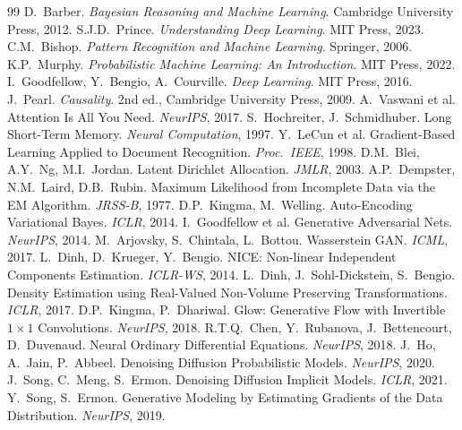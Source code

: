 \documentclass[11pt,a4paper,openany]{book}
\theoremstyle{definition}
\begin{document}
\cleardoublepage
{}
\begin{thebibliography}{99}
 D.\ Barber. \textit{Bayesian Reasoning and Machine Learning}. Cambridge University Press, 2012.
 S.J.D.\ Prince. \textit{Understanding Deep Learning}. MIT Press, 2023.
 C.M.\ Bishop. \textit{Pattern Recognition and Machine Learning}. Springer, 2006.
 K.P.\ Murphy. \textit{Probabilistic Machine Learning: An Introduction}. MIT Press, 2022.
 I.\ Goodfellow, Y.\ Bengio, A.\ Courville. \textit{Deep Learning}. MIT Press, 2016.
 J.\ Pearl. \textit{Causality}. 2nd ed., Cambridge University Press, 2009.
 A.\ Vaswani et al. Attention Is All You Need. \textit{NeurIPS}, 2017.
 S.\ Hochreiter, J.\ Schmidhuber. Long Short-Term Memory. \textit{Neural Computation}, 1997.
 Y.\ LeCun et al. Gradient-Based Learning Applied to Document Recognition. \textit{Proc.\ IEEE}, 1998.
 D.M.\ Blei, A.Y.\ Ng, M.I.\ Jordan. Latent Dirichlet Allocation. \textit{JMLR}, 2003.
 A.P.\ Dempster, N.M.\ Laird, D.B.\ Rubin. Maximum Likelihood from Incomplete Data via the EM Algorithm. \textit{JRSS-B}, 1977.
 D.P.\ Kingma, M.\ Welling. Auto-Encoding Variational Bayes. \textit{ICLR}, 2014.
 I.\ Goodfellow et al. Generative Adversarial Nets. \textit{NeurIPS}, 2014.
 M.\ Arjovsky, S.\ Chintala, L.\ Bottou. Wasserstein GAN. \textit{ICML}, 2017.
 L.\ Dinh, D.\ Krueger, Y.\ Bengio. NICE: Non-linear Independent Components Estimation. \textit{ICLR-WS}, 2014.
 L.\ Dinh, J.\ Sohl-Dickstein, S.\ Bengio. Density Estimation using Real-Valued Non-Volume Preserving Transformations. \textit{ICLR}, 2017.
 D.P.\ Kingma, P.\ Dhariwal. Glow: Generative Flow with Invertible $1\times 1$ Convolutions. \textit{NeurIPS}, 2018.
 R.T.Q.\ Chen, Y.\ Rubanova, J.\ Bettencourt, D.\ Duvenaud. Neural Ordinary Differential Equations. \textit{NeurIPS}, 2018.
 J.\ Ho, A.\ Jain, P.\ Abbeel. Denoising Diffusion Probabilistic Models. \textit{NeurIPS}, 2020.
 J.\ Song, C.\ Meng, S.\ Ermon. Denoising Diffusion Implicit Models. \textit{ICLR}, 2021.
 Y.\ Song, S.\ Ermon. Generative Modeling by Estimating Gradients of the Data Distribution. \textit{NeurIPS}, 2019.

\end{thebibliography}
\end{document}
